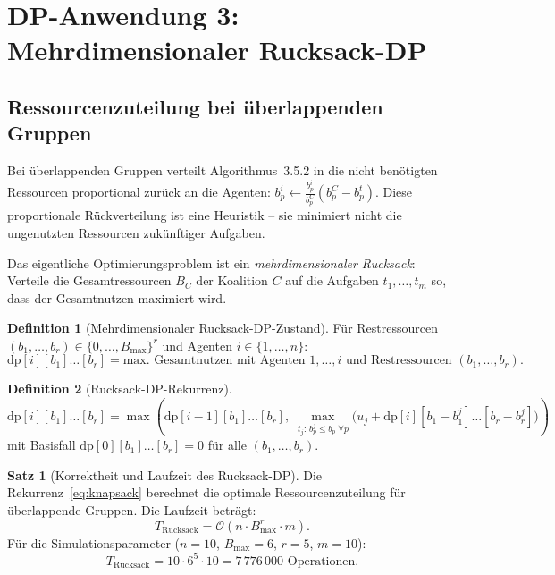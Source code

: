\documentclass[a4paper,12pt]{article}
\theoremstyle{definition}
\newtheorem{definition}{Definition}
\newtheorem{satz}{Satz}
\begin{document}
\section{DP-Anwendung 3: Mehrdimensionaler Rucksack-DP}

\subsection{Ressourcenzuteilung bei \"{u}berlappenden Gruppen}

Bei \"{u}berlappenden Gruppen verteilt Algorithmus~3.5.2 in \cite{sk98} die nicht
ben\"{o}tigten Ressourcen proportional zur\"{u}ck an die Agenten:
$b_p^i \leftarrow \frac{b_p^i}{b_p^C}(b_p^C - b_p^t)$.
Diese proportionale R\"{u}ckverteilung ist eine Heuristik -- sie minimiert
nicht die ungenutzten Ressourcen zuk\"{u}nftiger Aufgaben.

Das eigentliche Optimierungsproblem ist ein \emph{mehrdimensionaler Rucksack}:
Verteile die Gesamtressourcen $B_C$ der Koalition $C$ auf die Aufgaben
$t_1, \ldots, t_m$ so, dass der Gesamtnutzen maximiert wird.

\begin{definition}[Mehrdimensionaler Rucksack-DP-Zustand]
    F\"{u}r Restressourcen $(b_1, \ldots, b_r) \in \{0, \ldots, B_{\max}\}^r$
    und Agenten $i \in \{1, \ldots, n\}$:
    \[
        \mathrm{dp}[i][b_1]\ldots[b_r] =
        \text{max. Gesamtnutzen mit Agenten } 1, \ldots, i
        \text{ und Restressourcen } (b_1, \ldots, b_r).
    \]
\end{definition}

\begin{definition}[Rucksack-DP-Rekurrenz]
    \begin{equation}
        \mathrm{dp}[i][b_1]\ldots[b_r] =
        \max\!\left(
            \mathrm{dp}[i-1][b_1]\ldots[b_r],\;
            \max_{t_j:\, b_p^j \leq b_p\; \forall p} \!\!
            \bigl(u_j + \mathrm{dp}[i][b_1 - b_1^j]\ldots[b_r - b_r^j]\bigr)
        \right)
        \label{eq:knapsack}
    \end{equation}
    mit Basisfall $\mathrm{dp}[0][b_1]\ldots[b_r] = 0$ f\"{u}r alle $(b_1,\ldots,b_r)$.
\end{definition}

\begin{satz}[Korrektheit und Laufzeit des Rucksack-DP]
    \label{satz:knapsack}
    Die Rekurrenz~\eqref{eq:knapsack} berechnet die optimale Ressourcenzuteilung
    f\"{u}r \"{u}berlappende Gruppen. Die Laufzeit betr\"{a}gt:
    \[
        T_{\mathrm{Rucksack}} = \mathcal{O}\!\left(n \cdot B_{\max}^r \cdot m\right).
    \]
    F\"{u}r die Simulationsparameter ($n = 10$, $B_{\max} = 6$, $r = 5$, $m = 10$):
    \[
        T_{\mathrm{Rucksack}} = 10 \cdot 6^5 \cdot 10 = 7\,776\,000 \text{ Operationen}.
    \]
\end{satz}
\end{document}
